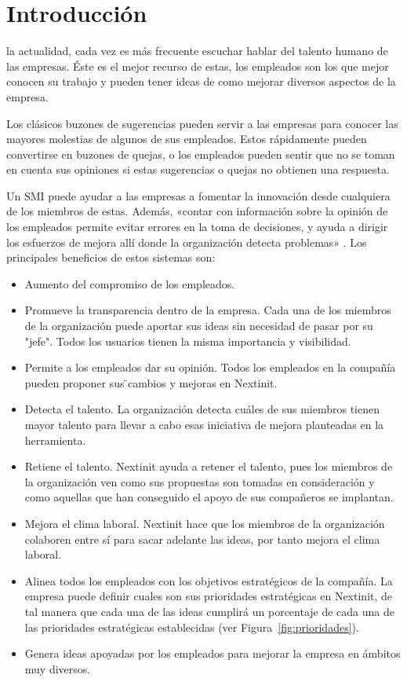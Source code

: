\chapter{Introducción}

 la actualidad, cada vez es más frecuente escuchar hablar del talento humano de las empresas. Éste es el mejor recurso de estas,
 los empleados son los que mejor conocen su trabajo y pueden tener ideas de como mejorar diversos aspectos de la empresa. 
 
 Los clásicos buzones de sugerencias pueden servir a las empresas para conocer las mayores molestias de algunos de sus empleados. Estos 
 rápidamente pueden convertirse en buzones de quejas, o los empleados pueden sentir que no se toman en cuenta sus opiniones si estas 
 sugerencias o quejas no obtienen una respuesta.
 
 Un \acf{SMI} puede ayudar a las empresas a fomentar la innovación desde cualquiera de los miembros de 
 estas. Además, «contar con información sobre la opinión de los empleados permite evitar errores en la toma de decisiones, y ayuda a dirigir los esfuerzos de mejora allí donde la organización detecta problemas» \cite{talento}. Los principales beneficios de estos sistemas son:
 
 \begin{itemize}
 	\item Aumento del compromiso de los empleados. 
 	\item Promueve la transparencia dentro de la empresa. Cada una de los miembros de la organización
 	puede aportar sus ideas sin necesidad de pasar por 	su "jefe". Todos los usuarios tienen la misma
 	 importancia y visibilidad.
 	\item Permite a los empleados dar su opinión. Todos los empleados en la compañía pueden proponer sus  ̈cambios y mejoras en Nextinit.
 	\item Detecta el talento. La organización detecta cuáles de sus miembros tienen
 	mayor talento para llevar a cabo esas iniciativa de mejora planteadas en la herramienta.
 	\item Retiene el talento. Nextinit ayuda a retener el talento, pues los miembros de la organización
 	 ven como sus propuestas son tomadas en consideración y como aquellas que han conseguido el apoyo de
 	  sus compañeros se implantan.
 	\item Mejora el clima laboral. Nextinit hace que los miembros de la organización colaboren entre sí 
 	para sacar adelante las ideas, por tanto mejora el clima laboral.
 	\item Alinea todos los empleados con los objetivos estratégicos de la compañía. La empresa puede definir cuales son sus prioridades estratégicas en Nextinit, de tal manera que cada una de las ideas 
 	cumplirá un porcentaje de cada una de las prioridades estratégicas establecidas (ver Figura~\ref{fig:prioridades}).
 	\item Genera ideas apoyadas por los empleados para mejorar la empresa en ámbitos muy diversos.
 \end{itemize}

